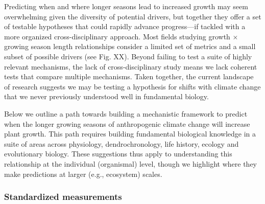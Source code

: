 \documentclass[11pt]{article}
\begin{document}
Predicting when and where longer seasons lead to increased growth may seem overwhelming given the diversity of potential drivers, but together they offer a set of testable hypotheses that could rapidly advance progress---if tackled with a more organized cross-disciplinary approach. Most fields studying growth $\times$ growing season length relationships consider a limited set of metrics and a small subset of possible drivers (see Fig. XX). Beyond failing to test a suite of highly relevant mechanisms, the lack of cross-disciplinary study means we lack coherent tests that compare multiple mechanisms. Taken together, the current landscape of research suggests we may be testing a hypothesis for shifts with climate change that we never previously understood well in fundamental biology. %


Below we outline a path towards building a mechanistic framework to predict when the longer growing seasons of anthropogenic climate change will increase plant growth. This path requires building fundamental biological knowledge in a suite of areas across physiology, dendrochronology, life history, ecology and evolutionary biology. These suggestions thus apply to understanding this relationship at the individual (organismal) level, though we highlight where they make predictions at larger (e.g., ecosystem) scales. %

\subsubsection*{Standardized measurements} %
\end{document}
